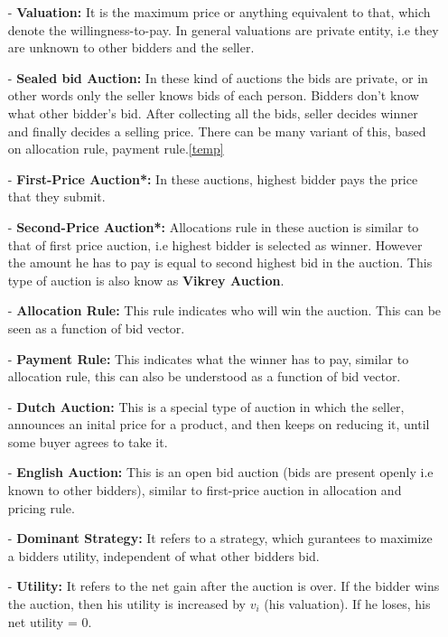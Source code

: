 \documentclass[a4paper]{article}
\begin{document}
\begin{itemize}
    \item[-] \textbf{Valuation:} It is the maximum price or anything equivalent to that, which denote the willingness-to-pay. In general valuations are private entity, i.e they are unknown to other bidders and the seller.  


    \item[-] \textbf{Sealed bid Auction:} In these kind of auctions the bids are private, or in other words only the seller knows bids of each person. Bidders don't know what other bidder's bid. After collecting all the bids, seller decides winner and finally decides a selling price. There can be many variant of this, based on allocation rule, payment rule.\ref{temp}

    \item[-] \textbf{First-Price Auction*:} In these auctions, highest bidder pays the price that they submit. \label{temp}

    \item[-] \textbf{Second-Price Auction*:} Allocations rule in these auction is similar to that of first price auction, i.e highest bidder is selected as winner. However the amount he has to pay is equal to second highest bid in the auction. This type of auction is also know as \textbf{Vikrey Auction}.

    \item[-] \textbf{Allocation Rule:} This rule indicates who will win the auction. This can be seen as a function of bid vector.

    \item[-] \textbf{Payment Rule:} This indicates what the winner has to pay, similar to allocation rule, this can also be understood as a function of bid vector.

    \item[-] \textbf{Dutch Auction:} This is a special type of auction in which the seller, announces an inital price for a product, and then keeps on reducing it, until some buyer agrees to take it.

    \item[-] \textbf{English Auction:} This is an open bid auction (bids are present openly i.e known to other bidders), similar to first-price auction in allocation and pricing rule.

    \item[-] \textbf{Dominant Strategy:} It refers to a strategy, which gurantees to maximize a bidders utility, independent of what other bidders bid.

    \item[-] \textbf{Utility:} It refers to the net gain after the auction is over. If the bidder wins the auction, then his utility is increased by $v_i$ (his valuation). If he loses, his net utility = $0$.
\end{itemize}
\end{document}
